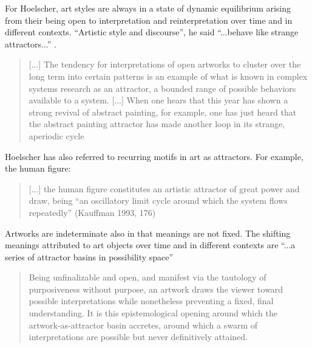                For Hoelscher, art styles are always in a state of dynamic equilibrium arising from their being open to interpretation and reinterpretation over time and in different contexts. “Artistic style and discourse”, he said “...behave like strange attractors...” \citep[p.11]{HoelscherThPtcsOfPhsSpc2014}.
                
                \begin{quote}
                    [...] The tendency for interpretations of open artworks to cluster over the long term into certain patterns is an example of what is known in complex systems research as an attractor, a bounded range of possible behaviors available to a system. [...] When one hears that this year has shown a strong revival of abstract painting, for example, one has just heard that the abstract painting attractor has made another loop in its strange, aperiodic cycle \citep[pp.10-11]{HoelscherThPtcsOfPhsSpc2014}
                \end{quote}

                Hoelscher has also referred to recurring motifs in art as attractors. For example, the human figure:
                
                \begin{quote}
                    [...] the human figure constitutes an artistic attractor of great power and draw, being “an oscillatory limit cycle around which the system flows repeatedly” (Kauffman 1993, 176) \citep[pp.11-12]{HoelscherThPtcsOfPhsSpc2014}
                \end{quote}

                Artworks are indeterminate also in that meanings are not fixed. The shifting meanings attributed to art objects over time and in different contexts are “...a series of attractor basins in possibility space” \citep[p.4]{HoelscherThPtcsOfPhsSpc2014}
                
                \begin{quote}
                    Being unfinalizable and open, and manifest via the tautology of purposiveness without purpose, an artwork draws the viewer toward possible interpretations while nonetheless preventing a fixed, final understanding. It is this epistemological opening around which the artwork-as-attractor basin accretes, around which a swarm of interpretations are possible but never definitively attained. \citep[p.12]{HoelscherThPtcsOfPhsSpc2014}
                \end{quote}

